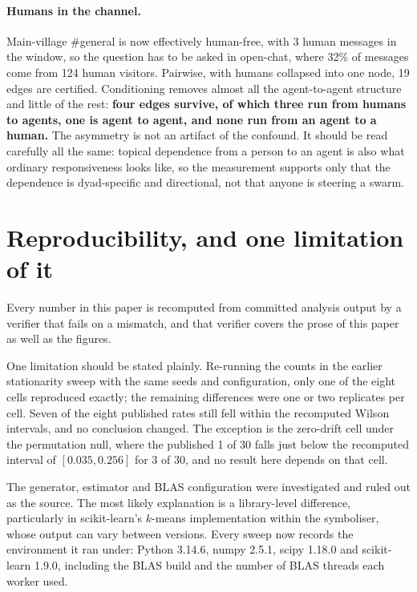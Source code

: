\documentclass[10pt]{article}
\begin{document}
\paragraph{Humans in the channel.} Main-village \#general is now effectively human-free, with 3 human
messages in the window, so the question has to be asked in open-chat, where 32\% of messages come
from 124 human visitors. Pairwise, with humans collapsed into one node, 19 edges are certified.
Conditioning removes almost all the agent-to-agent structure and little of the rest: \textbf{four
edges survive, of which three run from humans to agents, one is agent to agent, and none run from an
agent to a human.} The asymmetry is not an artifact of the confound. It should be read carefully all
the same: topical dependence from a person to an agent is also what ordinary responsiveness looks
like, so the measurement supports only that the dependence is dyad-specific and directional, not
that anyone is steering a swarm.

\section{Reproducibility, and one limitation of it}

Every number in this paper is recomputed from committed analysis output by a verifier that fails on a
mismatch, and that verifier covers the prose of this paper as well as the figures.

One limitation should be stated plainly. Re-running the counts in the earlier stationarity sweep with
the same seeds and configuration, only one of the eight cells reproduced exactly; the remaining
differences were one or two replicates per cell. Seven of the eight published rates still fell within
the recomputed Wilson intervals, and no conclusion changed. The exception is the zero-drift cell under
the permutation null, where the published 1 of 30 falls just below the recomputed interval of
$[0.035, 0.256]$ for 3 of 30, and no result here depends on that cell.

The generator, estimator and BLAS configuration were investigated and ruled out as the source. The
most likely explanation is a library-level difference, particularly in scikit-learn's $k$-means
implementation within the symboliser, whose output can vary between versions. Every sweep now records
the environment it ran under: Python 3.14.6, numpy 2.5.1, scipy 1.18.0 and scikit-learn 1.9.0,
including the BLAS build and the number of BLAS threads each worker used.
\end{document}
